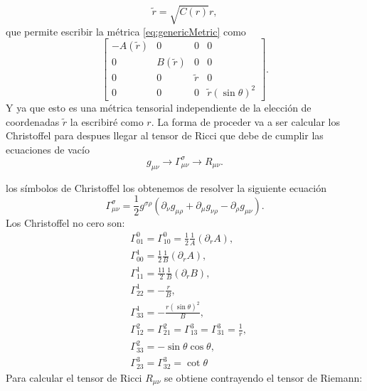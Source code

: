 \begin{equation}
    \tilde{r}=\sqrt{C(r)}  r,
\end{equation}
que permite escribir la métrica \ref{eq:genericMetric} como 
\begin{equation}
    \left[\begin{array}{cccc}
            -A(\tilde{r}) & 0    & 0        & 0                       \\
            0     & B(\tilde{r}) & 0        & 0                       \\
            0     & 0    & \tilde{r} & 0                       \\
            0     & 0    & 0        & \tilde{r} (\sin \theta)^2
        \end{array}\right].
\end{equation}
Y ya que esto es una métrica tensorial independiente de la elección de coordenadas  $\tilde{r}$ la escribiré como $r$.
La forma de proceder va a ser  calcular los Christoffel para despues llegar al tensor de Ricci que debe de cumplir las ecuaciones de vacío 
\begin{equation*}
    g_{\mu \nu} \rightarrow \Gamma_{\mu \nu}^\sigma \rightarrow R_{\mu \nu}.
\end{equation*}

los símbolos de Christoffel los obtenemos de resolver la siguiente ecuación
\begin{equation}
    \Gamma_{\mu \nu}^\sigma=\frac{1}{2} g^{\sigma \rho}\left(\partial_\nu g_{\mu \rho}+\partial_\mu g_{\nu \rho}-\partial_\rho g_{\mu \nu}\right).
\end{equation}
Los Christoffel no cero son:
\begin{equation}
\begin{aligned}
    &\Gamma_{01}^0=\Gamma_{10}^0=\frac{1}{2} \frac{1}{A}\left(\partial_r A\right),\\ 
    &\Gamma_{00}^1=\frac{1}{2} \frac{1}{B}\left(\partial_r A\right),\\
    & \Gamma_{11}^1=\frac{11}{2} \frac{1}{B}\left(\partial_r B\right),\\
    &\Gamma_{22}^1=-\frac{r}{B},\\
    &\Gamma_{33}^1=-\frac{r(\sin \theta)^2}{B},\\
    &\Gamma_{12}^2=\Gamma_{21}^2=\Gamma_{13}^3=\Gamma_{31}^3=\frac{1}{r},\\
    &\Gamma_{33}^2=-\sin \theta \cos \theta,\\
    &\Gamma_{23}^3=\Gamma_{32}^3=\cot \theta
\end{aligned}
\end{equation}
Para calcular el tensor de Ricci $R_{\mu \nu}$ se obtiene contrayendo el tensor de Riemann:

